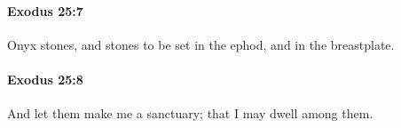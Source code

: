 		\paragraph{Exodus 25:7} %
			\label{EXODUS-25-7}

			Onyx stones, and stones to be set in the ephod, and in the breastplate.


		\paragraph{Exodus 25:8} %
			\label{EXODUS-25-8}

			And let them make me a sanctuary; that I may dwell among them.


